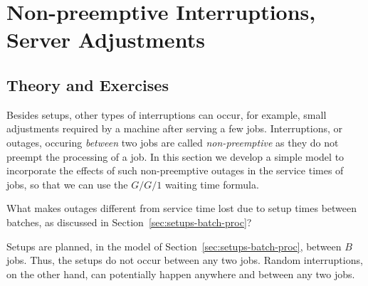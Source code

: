 \section{Non-preemptive Interruptions, Server Adjustments}
\label{sec:non-preempt-interr}

\subsection*{Theory and Exercises}



Besides setups, other types of interruptions can occur, for example, small adjustments required by a machine after serving a few jobs.  Interruptions, or outages, occuring \emph{between} two jobs are called \emph{non-preemptive} as they do not preempt the processing of a job.  In this section we develop a simple model to incorporate the effects of such non-preemptive outages in the service times of jobs, so that we can use the $G/G/1$ waiting time formula. 


\begin{exercise}
  What makes outages different from service time lost due to setup times between batches, as discussed in Section~\ref{sec:setups-batch-proc}?  
  \begin{solution}
Setups are planned, in the model of Section~\ref{sec:setups-batch-proc}, between $B$ jobs. Thus, the setups do not occur between any two jobs.  Random interruptions, on the other hand, can potentially happen anywhere and between any two jobs. 
  \end{solution}
\end{exercise}


